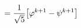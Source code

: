 \documentclass[preview]{standalone}
\begin{document}
\begin{align*}
\special{dvisvgm:raw <g id='unique000'>}= \frac{1}{\sqrt{5}}\big[\varphi^{k+1} - \psi^{k+1}\big]\special{dvisvgm:raw </g>}
\end{align*}
\end{document}
